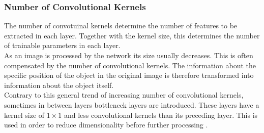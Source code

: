 
 
\subsubsection{Number of Convolutional Kernels}
The number of convotuinal kernels determine the number of features to be extracted in each layer. Together with the kernel size, this determines the number of trainable parameters in each layer. \\

As an image is processed by the network its size usually decreases. This is often compensated by the number of convolutional kernels. The information about the specific position of the object in the original image is therefore transformed into information about the object itself. \\

Contrary to this general trend of increasing number of convolutional kernels, sometimes in between layers bottleneck layers are introduced. These layers have a kernel size of $1\times 1$ and less convolutional kernels than its preceding layer. This is used in order to reduce dimensionality before further processing \cite{Lin2013}.

